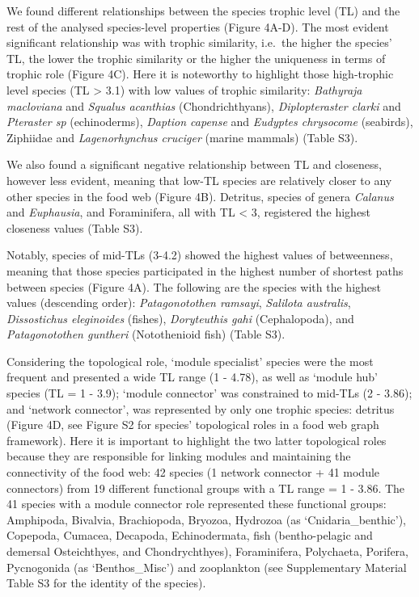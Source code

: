 \documentclass[preprint, 3p,
authoryear]{elsarticle} %
\begin{document}
We found different relationships between the species trophic level (TL)
and the rest of the analysed species-level properties (Figure 4A-D). The
most evident significant relationship was with trophic similarity,
i.e.~the higher the species' TL, the lower the trophic similarity or the
higher the uniqueness in terms of trophic role (Figure 4C). Here it is
noteworthy to highlight those high-trophic level species (TL
\textgreater{} 3.1) with low values of trophic similarity:
\emph{Bathyraja macloviana} and \emph{Squalus acanthias}
(Chondrichthyans), \emph{Diplopteraster clarki} and \emph{Pteraster sp}
(echinoderms), \emph{Daption capense} and \emph{Eudyptes chrysocome}
(seabirds), Ziphiidae and \emph{Lagenorhynchus cruciger} (marine
mammals) (Table S3).

We also found a significant negative relationship between TL and
closeness, however less evident, meaning that low-TL species are
relatively closer to any other species in the food web (Figure 4B).
Detritus, species of genera \emph{Calanus} and \emph{Euphausia}, and
Foraminifera, all with TL \textless{} 3, registered the highest
closeness values (Table S3).

Notably, species of mid-TLs (3-4.2) showed the highest values of
betweenness, meaning that those species participated in the highest
number of shortest paths between species (Figure 4A). The following are
the species with the highest values (descending order):
\emph{Patagonotothen ramsayi}, \emph{Salilota australis},
\emph{Dissostichus eleginoides} (fishes), \emph{Doryteuthis gahi}
(Cephalopoda), and \emph{Patagonotothen guntheri} (Notothenioid fish)
(Table S3).

Considering the topological role, `module specialist' species were the
most frequent and presented a wide TL range (1 - 4.78), as well as
`module hub' species (TL = 1 - 3.9); `module connector' was constrained
to mid-TLs (2 - 3.86); and `network connector', was represented by only
one trophic species: detritus (Figure 4D, see Figure S2 for species'
topological roles in a food web graph framework). Here it is important
to highlight the two latter topological roles because they are
responsible for linking modules and maintaining the connectivity of the
food web: 42 species (1 network connector + 41 module connectors) from
19 different functional groups with a TL range = 1 - 3.86. The 41
species with a module connector role represented these functional
groups: Amphipoda, Bivalvia, Brachiopoda, Bryozoa, Hydrozoa (as
`Cnidaria\_benthic'), Copepoda, Cumacea, Decapoda, Echinodermata, fish
(bentho-pelagic and demersal Osteichthyes, and Chondrychthyes),
Foraminifera, Polychaeta, Porifera, Pycnogonida (as `Benthos\_Misc') and
zooplankton (see Supplementary Material Table S3 for the identity of the
species).
\end{document}
